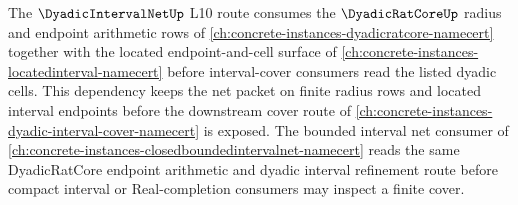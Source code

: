 The $\DyadicIntervalNetUp$ L10 route consumes the $\DyadicRatCoreUp$ radius and endpoint arithmetic rows of \autoref{ch:concrete-instances-dyadicratcore-namecert} together with the located endpoint-and-cell surface of \autoref{ch:concrete-instances-locatedinterval-namecert} before interval-cover consumers read the listed dyadic cells. This dependency keeps the net packet on finite radius rows and located interval endpoints before the downstream cover route of \autoref{ch:concrete-instances-dyadic-interval-cover-namecert} is exposed. The bounded interval net consumer of \autoref{ch:concrete-instances-closedboundedintervalnet-namecert} reads the same DyadicRatCore endpoint arithmetic and dyadic interval refinement route before compact interval or Real-completion consumers may inspect a finite cover.
